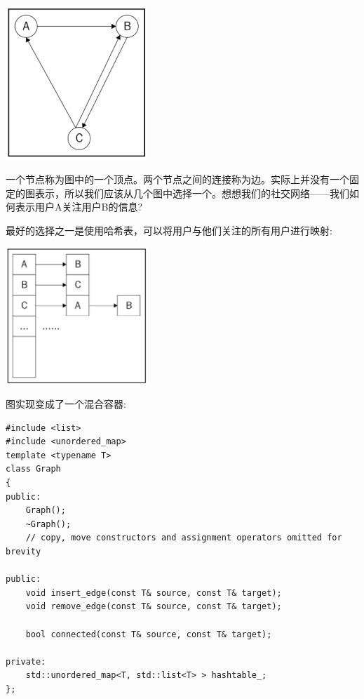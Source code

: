 \begin{center}
	\includegraphics[width=0.4\textwidth]{content/Section-2/Chapter-6/28}
\end{center}

一个节点称为图中的一个顶点。两个节点之间的连接称为边。实际上并没有一个固定的图表示，所以我们应该从几个图中选择一个。想想我们的社交网络——我们如何表示用户A关注用户B的信息? \par
最好的选择之一是使用哈希表，可以将用户与他们关注的所有用户进行映射: \par

\begin{center}
	\includegraphics[width=0.4\textwidth]{content/Section-2/Chapter-6/29}
\end{center}

图实现变成了一个混合容器: \par

\begin{lstlisting}[caption={}]
#include <list>
#include <unordered_map>
template <typename T>
class Graph
{
public:
	Graph();
	~Graph();
	// copy, move constructors and assignment operators omitted for brevity
	
public:
	void insert_edge(const T& source, const T& target);
	void remove_edge(const T& source, const T& target);
	
	bool connected(const T& source, const T& target);
	
private:
	std::unordered_map<T, std::list<T> > hashtable_;
};
\end{lstlisting}

